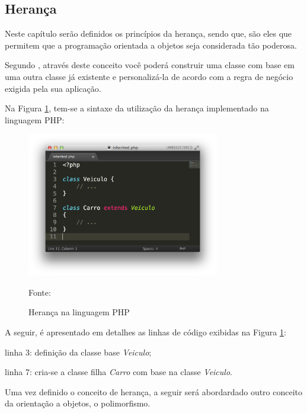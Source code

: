 \subsection{Herança}

Neste capítulo serão definidos os princípios da herança, sendo que, são eles que
permitem que a programação orientada a objetos seja considerada tão poderosa.

Segundo , através deste conceito você poderá
construir uma classe com base em uma outra classe já existente e personalizá-la
de acordo com a regra de negócio exigida pela sua aplicação.

Na Figura \ref{fig:heranca}, tem-se a sintaxe da utilização da herança
implementado na linguagem \acs{PHP}:

\begin{figure}[h!tb]
	\caption{Herança na linguagem PHP}
	\label{fig:heranca}

	\centering
	\includegraphics[width=0.75\textwidth]{images/inherited.png}

	\centering
	\footnotesize Fonte: \fonteOAutor
\end{figure}

\FloatBarrier 	%

A seguir, é apresentado em detalhes as linhas de código exibidas na Figura
\ref{fig:heranca}:

\begin{alineas}
    \item linha 3: definição da classe base \textit{Veiculo};
    \item linha 7: cria-se a classe filha \textit{Carro} com base na classe
    \textit{Veiculo}.
\end{alineas}

Uma vez definido o conceito de herança, a seguir será abordardado outro conceito
da orientação a objetos, o polimorfismo.
